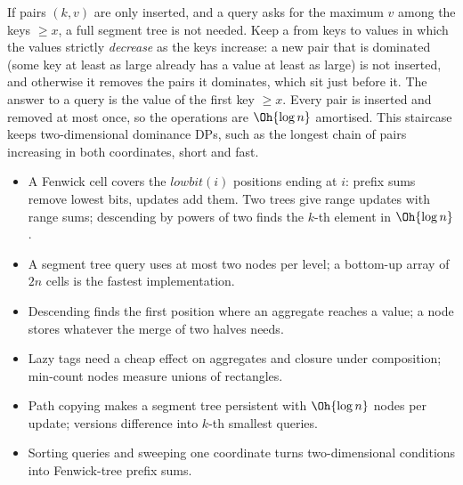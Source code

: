 If pairs $(k, v)$ are only inserted, and a query asks for the maximum $v$ among the keys $\ge x$, a full segment tree is not needed. Keep
a  from keys to values in which the values strictly \emph{decrease} as the keys increase: a new pair that is dominated (some key
at least as large already has a value at least as large) is not inserted, and otherwise it removes the pairs it dominates, which sit
just before it. The answer to a query is the value of the first key $\ge x$. Every pair is inserted and removed at most once, so the
operations are $\Oh{\log n}$ amortised. This staircase keeps two-dimensional dominance DPs, such as the longest chain of pairs
increasing in both coordinates, short and fast.

\begin{summary}
\begin{itemize}
  \item A Fenwick cell covers the $\mathit{lowbit}(i)$ positions ending at $i$: prefix sums remove lowest bits, updates add them. Two
        trees give range updates with range sums; descending by powers of two finds the $k$-th element in $\Oh{\log n}$.
  \item A segment tree query uses at most two nodes per level; a bottom-up array of $2n$ cells is the fastest implementation.
  \item Descending finds the first position where an aggregate reaches a value; a node stores whatever the merge of two halves needs.
  \item Lazy tags need a cheap effect on aggregates and closure under composition; min-count nodes measure unions of rectangles.
  \item Path copying makes a segment tree persistent with $\Oh{\log n}$ nodes per update; versions difference into $k$-th smallest
        queries.
  \item Sorting queries and sweeping one coordinate turns two-dimensional conditions into Fenwick-tree prefix sums.
\end{itemize}
\end{summary}

